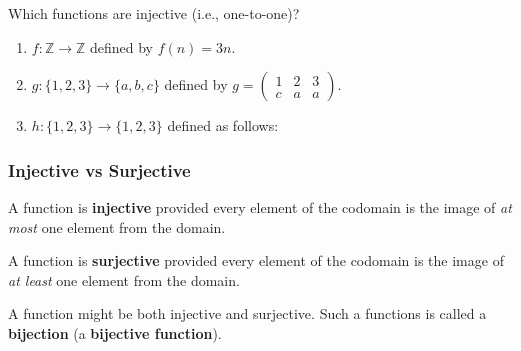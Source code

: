 \documentclass[11pt, compress]{beamer}
\newcommand{\terminology}[1]{\textbf{#1}}\newcommand{\lt}{<}
\newcommand{\amp}{&}
\newcommand{\Z}{\mathbb Z}
\begin{document}
\begin{frame}
\frametitle{}
\begin{example}[0.4.7]Which functions are injective (i.e., one-to-one)?\begin{enumerate}
\item{} \(f:\Z \to \Z\) defined by \(f(n) = 3n\).

\item{} \(g: \{1,2,3\} \to \{a,b,c\}\) defined by \(g = \begin{pmatrix}1 \amp 2 \amp 3 \\ c \amp a \amp a \end{pmatrix}\).

\item{} \(h:\{1,2,3\} \to \{1,2,3\}\) defined as follows:
\begin{sidebyside}{1}{0.4}{0.4}{0}%
\begin{sbspanel}{0.2}%
%
\end{sbspanel}%
\end{sidebyside}%

\end{enumerate}

\end{example}
\end{frame}
 
\begin{frame}
\frametitle{Injective vs Surjective}
 A function is \terminology{injective} provided every element of the codomain is the image of \emph{at most} one element from the domain.
 
\pause \vfill 

A function is \terminology{surjective} provided every element of the codomain is the image of \emph{at least} one element from the domain.
 
\pause \vfill 

A function might be both injective and surjective.  Such a functions is called a \terminology{bijection} (a \terminology{bijective function}).
\end{frame}
 
\end{document}
